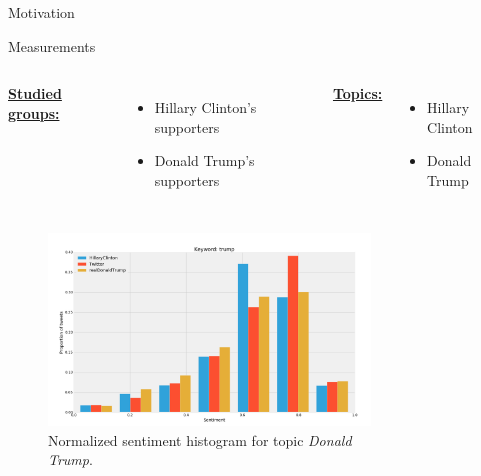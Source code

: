 \documentclass{beamer}
\begin{document}
\begin{frame}[fragile]
\begin{columns}[T]
\begin{column}{.63\textwidth}
\begin{customalertblock}{Motivation}
\end{customalertblock}
\begin{block}{Measurements}
    \begin{columns}
            \underline{\textbf{Studied groups:}}
            \vspace{1cm}
            \begin{itemize}
                \item Hillary Clinton's supporters
                \item Donald Trump's supporters
            \end{itemize}
            \underline{\textbf{Topics:}}
            \vspace{1cm}
            \begin{itemize}
                \item Hillary Clinton
                \item Donald Trump
            \end{itemize}
    \end{columns}
    \begin{columns}
            \begin{figure}
                \centering
                \captionsetup{justification=centering,margin=2cm}
                \includegraphics[scale=0.5]{./Pics/hist-trump.png}
                \caption*{Normalized sentiment histogram for topic \textit{Donald Trump}.}
            \end{figure}
            \begin{figure}

\end{figure}
\end{columns}
\end{block}
\end{column}
\end{columns}
\end{frame}
\end{document}
